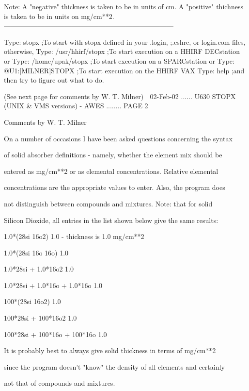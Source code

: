    Note: A "negative" thickness is taken to be in units of cm.
         A "positive" thichness is taken to be in units on mg/cm**2.
   ---------------------------------------------------------------------------
 
   Type:  stopx             ;To start with stopx defined in your .login,
                            ;.cshrc, or login.com files, otherwise,
   Type:  /usr/hhirf/stopx  ;To start execution on a HHIRF DECstation  or
   Type:  /home/upak/stopx  ;To start execution on a SPARCstation      or
   Type: @U1:[MILNER]STOPX  ;To start execution on the HHIRF VAX
   Type:  help              ;and then try to figure out what to do.
 
                  (See next page for comments by W. T. Milner)
    
   02-Feb-02 ...... U630  STOPX (UNIX & VMS versions) - AWES ........ PAGE   2
 
 
 
                            Comments by W. T. Milner
 
   On  a number of occasions I have been asked questions concerning the syntax
 
   of solid absorber definitions - namely, whether the element mix  should  be
 
   entered  as  mg/cm**2  or  as  elemental concentrations. Relative elemental
 
   concentrations are the appropriate values to enter. Also, the program  does
 
   not  distinguish  between  compounds  and  mixtures.  Note:  that for solid
 
   Silicon Dioxide, all entries in the list shown below give the same results:
 
 
   1.0*(28si 16o2)                1.0 - thickness is 1.0 mg/cm**2
 
   1.0*(28si 16o 16o)             1.0
 
   1.0*28si + 1.0*16o2            1.0
 
   1.0*28si + 1.0*16o + 1.0*16o   1.0
 
   100*(28si 16o2)                1.0
 
   100*28si + 100*16o2            1.0
 
   100*28si + 100*16o + 100*16o   1.0
 
 
   It is probably best to always give solid thickness  in  terms  of  mg/cm**2
 
   since  the program doesn't "know" the density of all elements and certainly
 
   not that of compounds and mixtures.
 
